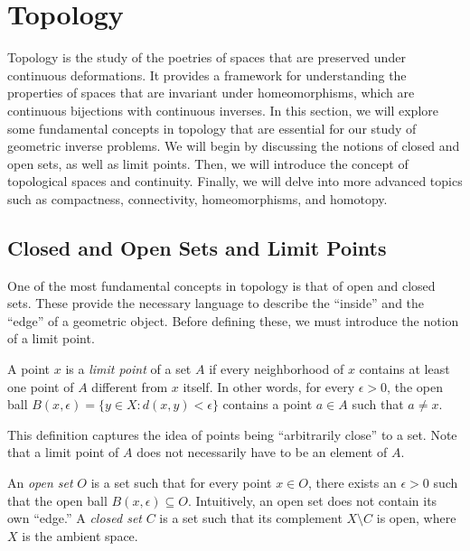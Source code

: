 \section{Topology}
\label{sec:topology}

Topology is the study of the poetries of spaces that are preserved under continuous deformations. It provides a framework for understanding the properties of spaces that are invariant under homeomorphisms, which are continuous bijections with continuous inverses. In this section, we will explore some fundamental concepts in topology that are essential for our study of geometric inverse problems. We will begin by discussing the notions of closed and open sets, as well as limit points. Then, we will introduce the concept of topological spaces and continuity. Finally, we will delve into more advanced topics such as compactness, connectivity, homeomorphisms, and homotopy.

\subsection{Closed and Open Sets and Limit Points} One of the most fundamental concepts in topology is that of open and closed sets. These provide the necessary language to describe the ``inside'' and the ``edge'' of a geometric object. Before defining these, we must introduce the notion of a limit point.

\begin{definition}
  A point $x$ is a \emph{limit point} of a set $A$ if every neighborhood of $x$ contains at least one point of $A$ different from $x$ itself. In other words, for every $\epsilon > 0$, the open ball $B(x, \epsilon) = \{y \in X : d(x,y) < \epsilon\}$ contains a point $a \in A$ such that $a \neq x$.
\end{definition}

This definition captures the idea of points being ``arbitrarily close'' to a set. Note that a limit point of $A$ does not necessarily have to be an element of $A$.

\begin{definition}
  An \emph{open set} $O$ is a set such that for every point $x \in O$, there exists an $\epsilon > 0$ such that the open ball $B(x, \epsilon) \subseteq O$. Intuitively, an open set does not contain its own ``edge.'' A \emph{closed set} $C$ is a set such that its complement $X \setminus C$ is open, where $X$ is the ambient space.
\end{definition}

